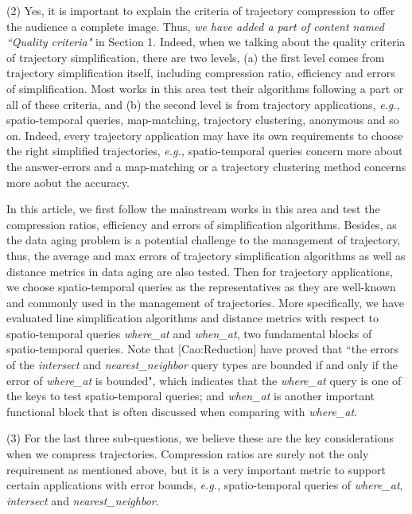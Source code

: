 \documentclass{letter}
\newcommand{\eg}{\emph{e.g.,}\xspace}
\begin{document}
(2) {Yes, it is important to explain the criteria of trajectory compression to offer the audience a complete image.} Thus, \emph{we have added a part of content named ``Quality criteria"} in Section 1. Indeed, when we talking about the quality criteria of trajectory simplification, there are two levels,
(a) the first level comes from trajectory simplification itself, including compression ratio, efficiency and errors of simplification. Most works in this area test their algorithms following a part or all of these criteria, and
(b) the second level is from trajectory applications, \eg spatio-temporal queries, map-matching, trajectory clustering, anonymous and so on. Indeed, every trajectory application may have its own requirements to choose the right simplified trajectories, \eg spatio-temporal queries concern more about the answer-errors and a map-matching or a trajectory clustering method concerns more aobut the accuracy.

In this article, we first follow the mainstream works in this area and test the compression ratios, efficiency and errors of simplification algorithms.
Besides, as the data aging problem is a potential challenge to the management of trajectory, thus, the average and max errors of trajectory simplification algorithms as well as distance metrics in data aging are also tested.
%
Then for trajectory applications, we choose spatio-temporal queries as the representatives as they are well-known and commonly used in the management of trajectories.
More specifically, we have evaluated line simplification algorithms and distance metrics with respect to spatio-temporal queries \emph{where\_at} and \emph{when\_at}, two fundamental blocks of spatio-temporal queries. Note that [Cao:Reduction] have proved that ``the errors of the \emph{intersect} and \emph{nearest\_neighbor} query types are bounded if and only if the error of \emph{where\_at} is bounded", which indicates that the \emph{where\_at} query is one of the keys to test spatio-temporal queries; and \emph{when\_at} is another important functional block that is often discussed when comparing with \emph{where\_at}.

(3) For the last three sub-questions, we believe these are the key considerations when we compress trajectories. Compression ratios are surely not the only requirement as mentioned above, but it is a very important metric to support certain applications with error bounds, \eg spatio-temporal queries of \emph{where\_at}, \emph{intersect} and \emph{nearest\_neighbor}.
\end{document}
